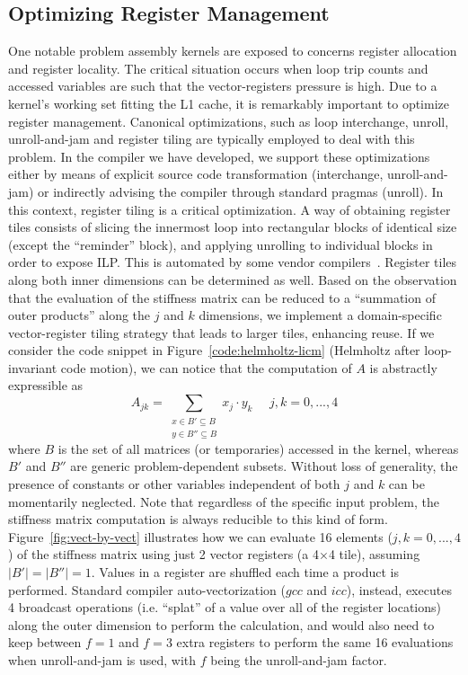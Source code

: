 \documentclass[conference]{IEEEtran}
\begin{document}
\subsection{Optimizing Register Management}
One notable problem assembly kernels are exposed to concerns register allocation and register locality. The critical situation occurs when loop trip counts and accessed variables are such that the vector-registers pressure is high. Due to a kernel's working set fitting the L1 cache, it is remarkably important to optimize register management. Canonical optimizations, such as loop interchange, unroll, unroll-and-jam and register tiling are typically employed to deal with this problem. In the compiler we have developed, we support these optimizations either by means of explicit source code transformation (interchange, unroll-and-jam) or indirectly advising the compiler through standard pragmas (unroll). 
In this context, register tiling is a critical optimization. A way of obtaining register tiles consists of slicing the innermost loop into rectangular blocks of identical size (except the ``reminder'' block), and applying unrolling to individual blocks in order to expose ILP. This is automated by some vendor compilers~\cite{comdex}. Register tiles along both inner dimensions can be determined as well. Based on the observation that the evaluation of the stiffness matrix can be reduced to a ``summation of outer products'' along the $j$ and $k$ dimensions, we implement a domain-specific vector-register tiling strategy that leads to larger tiles, enhancing reuse. If we consider the code snippet in Figure~\ref{code:helmholtz-licm} (Helmholtz after loop-invariant code motion), we can notice that the computation of $A$ is abstractly expressible as
\begin{equation}
\label{outer-product}
A_{jk} = \sum_{\substack{
  x \in B' \subseteq B \\ 
  y \in B'' \subseteq B}} 
x_j\cdot y_k ~~~~~~ j,k = 0,...,4
\end{equation}
where $B$ is the set of all matrices (or temporaries) accessed in the kernel, whereas $B'$ and $B''$ are generic problem-dependent subsets. Without loss of generality, the presence of constants or other variables independent of both $j$ and $k$ can be momentarily neglected. Note that regardless of the specific input problem, the stiffness matrix computation is always reducible to this kind of form. Figure~\ref{fig:vect-by-vect} illustrates how we can evaluate 16 elements ($j,k=0,...,4$) of the stiffness matrix using just 2 vector registers (a 4$\times$4 tile), assuming $\vert B' \vert = \vert B'' \vert = 1$. Values in a register are shuffled each time a product is performed. Standard compiler auto-vectorization ($gcc$ and $icc$), instead, executes 4 broadcast operations (i.e. ``splat'' of a value over all of the register locations) along the outer dimension to perform the calculation, and would also need to keep between $f=1$ and $f=3$ extra registers to perform the same 16 evaluations when unroll-and-jam is used, with $f$ being the unroll-and-jam factor. 
\end{document}
